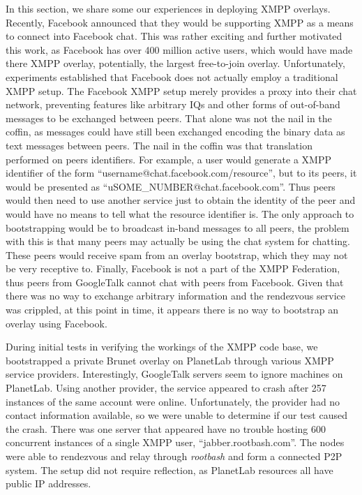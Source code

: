 \documentclass[conference]{IEEEtran}
\begin{document}
In this section, we share some our experiences in deploying XMPP overlays.
Recently, Facebook announced that they would be supporting XMPP as a means to
connect into Facebook chat.  This was rather exciting and further motivated
this work, as Facebook has over 400 million active users, which would have made
there XMPP overlay, potentially, the largest free-to-join overlay.
Unfortunately, experiments established that Facebook does not actually employ a
traditional XMPP setup.  The Facebook XMPP setup merely provides a proxy into
their chat network, preventing features like arbitrary IQs and other forms of
out-of-band messages to be exchanged between peers.  That alone was not the
nail in the coffin, as messages could have still been exchanged encoding the
binary data as text messages between peers.  The nail in the coffin was that
translation performed on peers identifiers.  For example, a user would generate
a XMPP identifier of the form ``username@chat.facebook.com/resource'', but to
its peers, it would be presented as ``uSOME\_NUMBER@chat.facebook.com''.  Thus
peers would then need to use another service just to obtain the identity of the
peer and would have no means to tell what the resource identifier is.  The only
approach to bootstrapping would be to broadcast in-band messages to all peers,
the problem with this is that many peers may actually be using the chat system
for chatting.  These peers would receive spam from an overlay bootstrap, which
they may not be very receptive to.  Finally, Facebook is not a part of the XMPP
Federation, thus peers from GoogleTalk cannot chat with peers from Facebook.
Given that there was no way to exchange arbitrary information and the
rendezvous service was crippled, at this point in time, it appears there is no
way to bootstrap an overlay using Facebook.

During initial tests in verifying the workings of the XMPP code base, we
bootstrapped a  private Brunet overlay on PlanetLab through various XMPP
service providers.  Interestingly, GoogleTalk servers seem to ignore machines
on PlanetLab.  Using another provider, the service appeared to crash after 257
instances of the same account were online.  Unfortunately, the provider had no
contact information available, so we were unable to determine if our test
caused the crash.  There was one server that appeared have no trouble hosting
600 concurrent instances of a single XMPP user, ``jabber.rootbash.com''.  The
nodes were able to rendezvous and relay through \textit{rootbash} and form a
connected P2P system.  The setup did not require reflection, as PlanetLab
resources all have public IP addresses.
\end{document}
